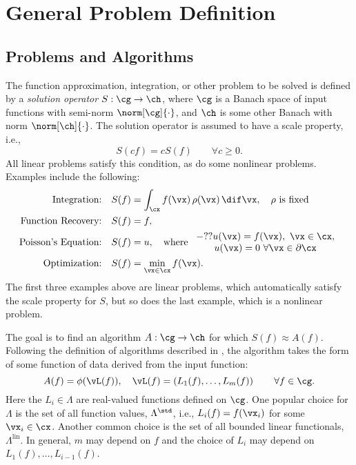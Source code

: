 \documentclass[final]{elsarticle}
\DeclareMathOperator{\lin}{lin}
\theoremstyle{definition}
\theoremstyle{remark}
\begin{document}
\section{General Problem Definition}

\subsection{Problems and Algorithms} The function approximation, integration, or other problem to be solved is defined by a \emph{solution operator} $S:\cg \to \ch$, where $\cg$ is a Banach space of input functions with semi-norm $\norm[\cg]{\cdot}$, and $\ch$ is some other Banach with norm $\norm[\ch]{\cdot}$. The solution operator is assumed to have a scale property, i.e., 
\[
S(cf) = cS(f) \qquad \forall c\ge 0.
\]
All linear problems satisfy this condition, as do some nonlinear problems.  Examples include the following:
\begin{align*}
\text{Integration:} \quad & S(f) = \int_{\cx} f(\vx) \, \rho(\vx) \, \dif \vx, \quad \rho \text{ is fixed}\\
\text{Function Recovery:} \quad & S(f) = f, \\
\text{Poisson's Equation:} \quad & S(f) = u, \quad \text{where } \begin{array}{c} -?? u(\vx) = f(\vx), \ \vx \in \cx, \\ u(\vx)=0 \ \forall \vx \in \partial \cx\end{array} \\
\text{Optimization:} \quad & S(f) = \min_{\vx \in \cx} f(\vx).
\end{align*}
The first three examples above are linear problems, which automatically satisfy the scale property for $S$, but so does the last example, which is a nonlinear problem.

The goal is to find an algorithm $A:\cg \to \ch$ for which $S(f) \approx A(f)$. Following the definition of algorithms described in \cite[Section 3.2]{TraWasWoz88}, the algorithm takes the form of some function of data derived from the input function:
\begin{equation}
\label{algoform}
A(f) =  \phi(\vL(f)), \quad \vL(f) = \left(L_1(f), \ldots, L_m(f)\right) \qquad \forall f \in \cg.
\end{equation}
Here the $L_i \in \Lambda$ are real-valued functions defined on $\cg$.  One popular choice for $\Lambda$ is the set of all function values, $\Lambda^{\std}$, i.e., $L_i(f) = f(\vx_i)$ for some $\vx_i \in \cx$.  Another common choice is the set of all bounded linear functionals, $\Lambda^{\lin}$.  In general, $m$ may depend on $f$ and the choice of $L_i$ may depend on $L_1(f), \ldots, L_{i-1}(f)$.
\end{document}
